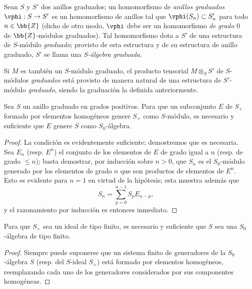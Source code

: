 \documentclass[oneside,10pt]{amsart}
\makeatletter
\renewcommand{\leq}{\leqslant}
\newcommand{\ega@arrow}[2]{\mathchoice{#1}{#2}{#2}{#2}}
\renewcommand{\to}{\ega@arrow{\longrightarrow}{\rightarrow}}
\newcommand{\oldpage}[2][]{\marginnote{\normalfont\footnotesize\textbf{#1}~|~#2}\ignorespaces}
\let\EGAOriginalLabel\label
\renewcommand{\label}[1]{\phantomsection\EGAOriginalLabel{#1}}
\makeatother
\begin{document}
\begin{env}[2.1.2]
\oldpage[II]{21}
Sean $S$ y $S'$ dos anillos graduados; un homomorfismo de \emph{anillos graduados $\vphi:S\to S'$} es un homomorfismo de anillos tal que $\vphi(S_n)\subset S_n'$ para todo $n\in\bb{Z}$ (dicho de otro modo, $\vphi$ debe ser un homomorfismo \emph{de grado $0$} de $\bb{Z}$-módulos graduados).
Tal homomorfismo dota a $S'$ de una estructura de $S$-módulo \emph{graduado}; provisto de esta estructura y de su estructura de anillo graduado, $S'$ se llama una \emph{$S$-álgebra graduada}.

Si $M$ es también un $S$-módulo graduado, el producto tensorial $M\otimes_S S'$ de $S$-módulos \emph{graduados} está provisto de manera natural de una estructura de $S'$-módulo \emph{graduado}, siendo la graduación la definida anteriormente.
\end{env}

\begin{lemma}[2.1.3]
\label{II.2.1.3}
Sea $S$ un anillo graduado en grados positivos.
Para que un subconjunto $E$ de $S_+$ formado por elementos homogéneos genere $S_+$ como $S$-módulo, es necesario y suficiente que $E$ genere $S$ como $S_0$-álgebra.
\end{lemma}

\begin{proof}
La condición es evidentemente suficiente; demostremos que es necesaria.
Sea $E_n$ (resp. $E^n$) el conjunto de los elementos de $E$ de grado igual a $n$ (resp. de grado $\leq n$); basta demostrar, por inducción sobre $n>0$, que $S_n$ es el $S_0$-módulo generado por los elementos de grado $n$ que son productos de elementos de $E^n$.
Esto es evidente para $n=1$ en virtud de la hipótesis; esta muestra además que
\[
  S_n=\sum_{p=0}^{n-1}S_pE_{n-p},
\]
y el razonamiento por inducción es entonces inmediato.
\end{proof}

\begin{corollary}[2.1.4]
\label{II.2.1.4}
Para que $S_+$ sea un ideal de tipo finito, es necesario y suficiente que $S$ sea una $S_0$-álgebra de tipo finito.
\end{corollary}

\begin{proof}
Siempre puede suponerse que un sistema finito de generadores de la $S_0$-álgebra $S$ (resp. del $S$-ideal $S_+$) está formado por elementos homogéneos, reemplazando cada uno de los generadores considerados por sus componentes homogéneas.
\end{proof}
\end{document}
